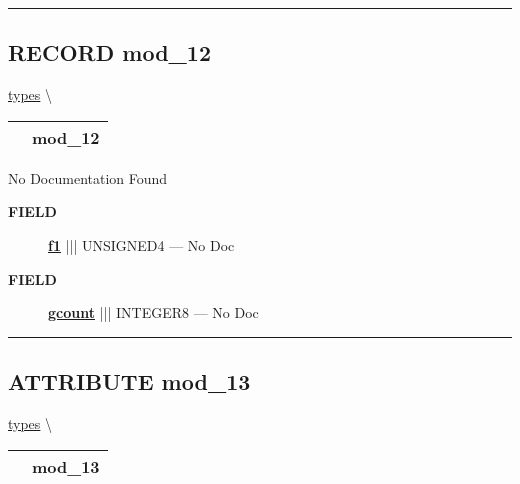 \rule{\linewidth}{0.5pt}
\subsection*{\textsf{\colorbox{headtoc}{\color{white} RECORD}
mod\_12}}

\hypertarget{ecldoc:types.mod_12}{}
\hspace{0pt} \hyperlink{ecldoc:types}{types} \textbackslash 

{\renewcommand{\arraystretch}{1.5}
\begin{tabularx}{\textwidth}{|>{\raggedright\arraybackslash}l|X|}
\hline
\hspace{0pt}\mytexttt{\color{red} } & \textbf{mod\_12} \\
\hline
\end{tabularx}
}

\par





No Documentation Found







\par
\begin{description}
\item [\colorbox{tagtype}{\color{white} \textbf{\textsf{FIELD}}}] \textbf{\underline{f1}} ||| UNSIGNED4 --- No Doc
\item [\colorbox{tagtype}{\color{white} \textbf{\textsf{FIELD}}}] \textbf{\underline{gcount}} ||| INTEGER8 --- No Doc
\end{description}





\rule{\linewidth}{0.5pt}
\subsection*{\textsf{\colorbox{headtoc}{\color{white} ATTRIBUTE}
mod\_13}}

\hypertarget{ecldoc:types.mod_13}{}
\hspace{0pt} \hyperlink{ecldoc:types}{types} \textbackslash 

{\renewcommand{\arraystretch}{1.5}
\begin{tabularx}{\textwidth}{|>{\raggedright\arraybackslash}l|X|}
\hline
\hspace{0pt}\mytexttt{\color{red} } & \textbf{mod\_13} \\
\hline
\end{tabularx}
}


